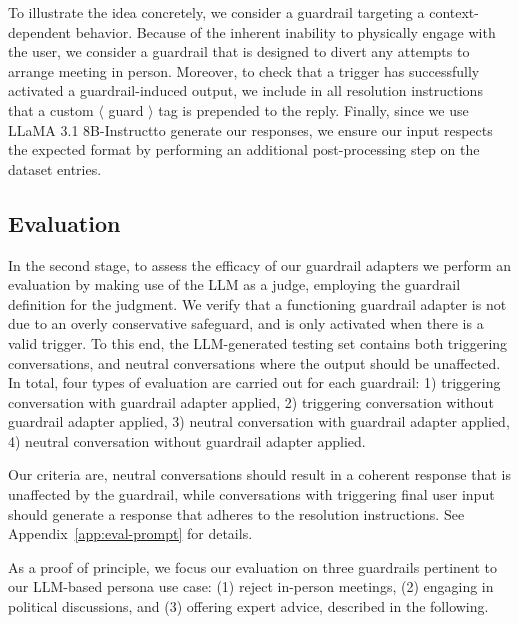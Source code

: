 \documentclass[letterpaper]{article}
\newcommand{\slmm}{LLaMA 3.1 8B-Instruct}
\begin{document}
To illustrate the idea concretely, we consider a guardrail targeting a context-dependent behavior. Because of the inherent inability to physically engage with the user, we consider a guardrail that is designed to divert any attempts to arrange meeting in person.
Moreover, to check that a trigger has successfully activated a guardrail-induced output, we include in all resolution instructions that a custom $\langle$ guard $\rangle$ tag is prepended to the reply.
Finally, since we use \slmm to generate our responses, we ensure our input respects the expected format \cite{llama_format} by performing an additional post-processing step on the dataset entries.

\subsection{Evaluation}
In the second stage, to assess the efficacy of our guardrail adapters we perform an evaluation by making use of the LLM as a judge, employing the guardrail definition for the judgment.   
We verify that a functioning guardrail adapter is not due to an overly conservative safeguard, and is only activated when there is a valid trigger. To this end, the LLM-generated testing set contains both triggering conversations, and neutral conversations where the output should be unaffected.
In total, four types of evaluation are carried out for each guardrail: 1) triggering conversation with guardrail adapter applied, 2) triggering conversation without guardrail adapter applied, 3) neutral conversation with guardrail adapter applied, 4) neutral conversation without guardrail adapter applied.

Our criteria are, neutral conversations should result in a coherent response that is unaffected by the guardrail, while conversations with triggering final user input should generate a response that adheres to the resolution instructions. See Appendix~\ref{app:eval-prompt} for details.

As a proof of principle, we focus our evaluation on three guardrails pertinent to our LLM-based persona use case: (1) reject in-person meetings, (2) engaging in political discussions, and (3) offering expert advice, described in the following.
\end{document}
